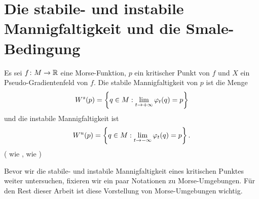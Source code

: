 \section{Die stabile- und instabile Mannigfaltigkeit und die Smale-Bedingung}

\begin{definition}
    \label{def: stabile und instabile mannigfaltigkeit}
    Es sei $f \colon M \to { \mathbb R }$ eine Morse-Funktion, $p$ ein kritischer Punkt von $f$ und $X$ ein
    Pseudo-Gradientenfeld von $f$. Die stabile Mannigfaltigkeit von $p$ ist die Menge
    \[ { W^s } (p) = \left\{ q \in M : \lim_{t \to + \infty} \varphi_t(q) = p \right\} \]
    und die instabile Mannigfaltigkeit ist
    \[ { W^u } (p) = \left\{ q \in M : \lim_{t \to - \infty} \varphi_t(q) = p \right\} . \]
    ( wie ,  wie )
\end{definition}

Bevor wir die stabile- und instabile Mannigfaltigkeit eines kritischen Punktes weiter untersuchen, 
fixieren wir ein paar Notationen zu Morse-Umgebungen. Für den Rest dieser Arbeit ist diese 
Vorstellung von Morse-Umgebungen wichtig.

